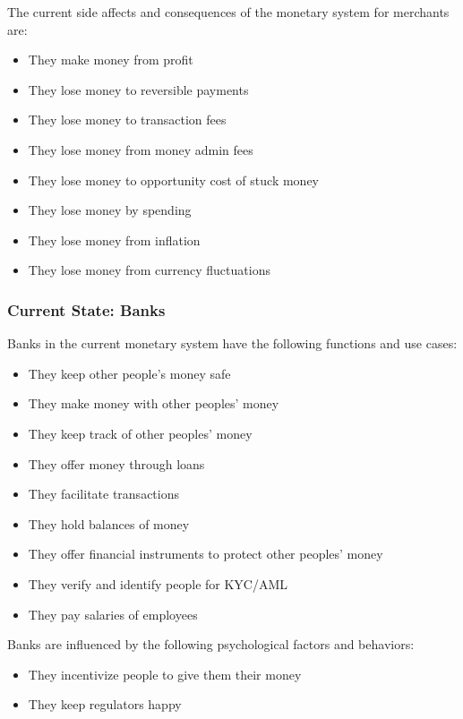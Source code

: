 \documentclass[12pt]{article} %
\begin{document}
{The current side affects and consequences of the monetary system for merchants are:

\begin{itemize}
	\item They make money from profit
	\item They lose money to reversible payments
	\item They lose money to transaction fees
	\item They lose money from money admin fees
	\item They lose money to opportunity cost of stuck money
	\item They lose money by spending
	\item They lose money from inflation
	\item They lose money from currency fluctuations
\end{itemize}

\subsubsection{Current State: Banks} \label{sssec:4.3:banks}

Banks in the current monetary system have the following functions and use cases:

\begin{itemize}
	\item They keep other people's money safe
	\item They make money with other peoples' money
	\item They keep track of other peoples' money
	\item They offer money through loans
	\item They facilitate transactions
	\item They hold balances of money
	\item They offer financial instruments to protect other peoples' money
	\item They verify and identify people for KYC/AML
	\item They pay salaries of employees
\end{itemize}

Banks are influenced by the following psychological factors and behaviors:

\begin{itemize}
	\item They incentivize people to give them their money
	\item They keep regulators happy
\end{itemize}

}
\end{document}
